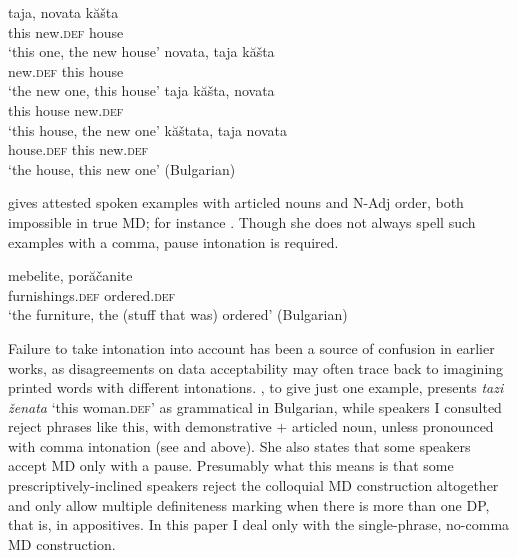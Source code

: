 \documentclass[output=paper,
colorlinks,
citecolor=brown,
newtxmath
]{langscibook}
\begin{document}
\ea \label{houses}
\ea \label{houses1}
\gll taja, novata kăšta\\
this new.\textsc{def} house\\
\glt `this one, the new house’
\ex \label{houses2}
\gll novata, taja kăšta \\
    new.\textsc{def} this house \\
    \glt `the new one, this house'
\ex \label{houses3}
\gll taja kăšta, novata \\
     this house new.\textsc{def}\\
    \glt `this house, the new one'
\ex \label{houses4}
\gll kăštata, taja  novata \\
     house.\textsc{def} this new.\textsc{def}\\
    \glt `the house, this new one' \hfill (Bulgarian)
\z
\z

\noindent \citet{Angelova1994} gives attested spoken examples with articled nouns and N-Adj order, both impossible in true MD; for instance . Though she does not always spell such examples with a comma, pause intonation is required.

\ea \label{furniture}
\gll  mebelite, porăčanite \\
furnishings.\textsc{def} ordered.\textsc{def} \\
\glt `the furniture, the (stuff that was) ordered’  \hfill (Bulgarian)
\z

\noindent Failure to take intonation into account has been a source of confusion in earlier works, as disagreements on data acceptability may often trace back to imagining printed words with different intonations. \cite{Arnaudova1998}, to give just one example, presents \textit{tazi ženata} `this woman.\textsc{def}' as grammatical in Bulgarian, while speakers I consulted reject phrases like this, with demonstrative $+$ articled noun,  unless pronounced with comma intonation (see  and  above). She also states that some speakers accept MD only with a pause. Presumably what this means is that some prescriptively-inclined speakers reject the colloquial MD construction altogether and only allow multiple definiteness marking when there is more than one DP, that is, in appositives. In this paper I deal only with the single-phrase, no-comma MD construction.
\end{document}
